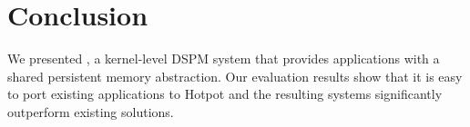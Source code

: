 \section{Conclusion}
\label{sec:conclude}

We presented \hotpot, a kernel-level DSPM system that provides applications
with a shared persistent memory abstraction. Our evaluation results show that
it is easy to port existing applications to Hotpot and the resulting systems
significantly outperform existing solutions.
